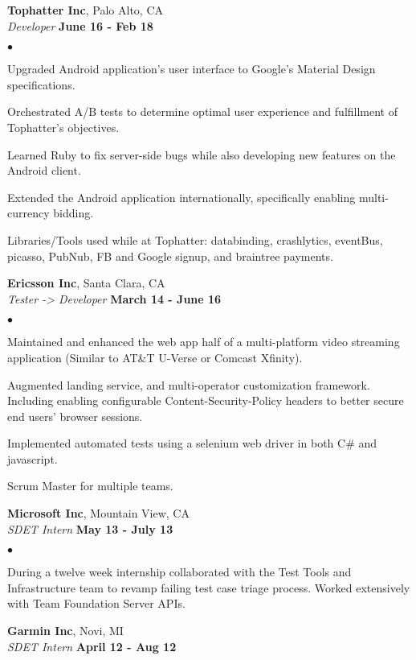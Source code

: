 \documentclass[margin,line]{res}
\newenvironment{list2}{
  \begin{list}{$\bullet$}{
      \setlength{\itemsep}{0in}
      \setlength{\parsep}{0in} \setlength{\parskip}{0in}
      \setlength{\topsep}{0in} \setlength{\partopsep}{0in} 
      \setlength{\leftmargin}{0.2in}}}{\end{list}}
\begin{document}
\begin{resume}
  {\bf Tophatter Inc}, Palo Alto, CA\\
  {\em Developer} \hfill {\bf June 16 - Feb 18}

\begin{list2}
  \item  Upgraded Android application’s user interface to Google’s Material Design specifications.
  \item  Orchestrated A/B tests to determine optimal user experience and fulfillment of Tophatter’s objectives.
  \item  Learned Ruby to fix server-side bugs while also developing new features on the Android client.
  \item  Extended the Android application internationally, specifically enabling multi-currency bidding.
  \item  Libraries/Tools used while at Tophatter: databinding, crashlytics, eventBus, picasso, PubNub, FB and Google signup, and braintree payments.
\end{list2}

  {\bf Ericsson Inc}, Santa Clara, CA\\
  {\em Tester -> Developer} \hfill {\bf March 14 - June 16}

\begin{list2}
  \item Maintained and enhanced the web app half of a multi-platform video streaming application (Similar to AT\&T U-Verse or Comcast Xfinity).
  \item Augmented landing service, and multi-operator customization framework. Including enabling configurable Content-Security-Policy headers to better secure end users’ browser sessions.
  \item Implemented automated tests using a selenium web driver in both C\# and javascript.
  \item Scrum Master for multiple teams.
\end{list2}

  {\bf Microsoft Inc}, Mountain View, CA\\
  {\em SDET Intern} \hfill {\bf May 13 - July 13}

\begin{list2}
  \item During a twelve week internship collaborated with the Test Tools and Infrastructure team to revamp failing test case triage process. Worked extensively with Team Foundation Server APIs.
\end{list2}

  {\bf Garmin Inc}, Novi, MI\\
  {\em SDET Intern} \hfill {\bf April 12 - Aug 12}


\end{resume}
\end{document}
